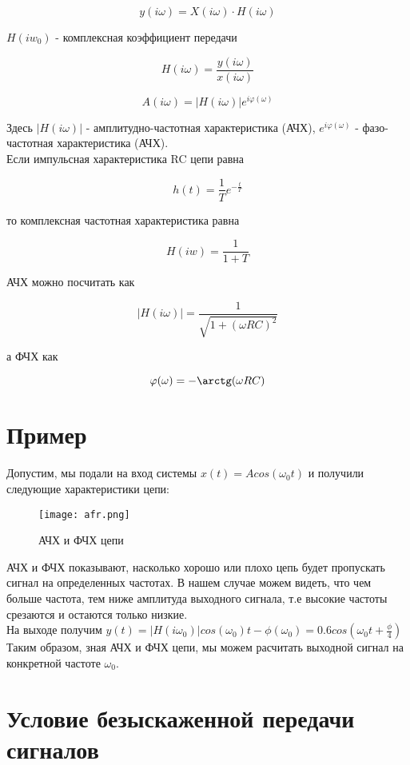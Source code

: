 \[
y(i\omega) = \boxed{X(i\omega) \cdot H(i\omega)}
\]

$H(iw_0)$ - комплексная коэффициент передачи 

\[
H(i\omega) = \frac{y(i\omega)}{x(i\omega)}
\]

\[
A(i\omega) = |H(i\omega)| e^{i\varphi(\omega)}
\]

Здесь $|H(i\omega)|$ - амплитудно-частотная характеристика (АЧХ), $e^{i\varphi(\omega)}$ - фазо-частотная характеристика (АЧХ). \\

Если импульсная характеристика RC цепи равна

\[
h(t) = \frac{1}{T}e^{-\frac{t}{T}}
\]

то комплексная частотная характеристика равна

\[
H(iw) = \frac{1}{1+T}
\]

АЧХ можно посчитать как

\[
|H(i\omega)| = \frac{1}{\sqrt{1 + (\omega RC)^2}}
\]

а ФЧХ как

\[
\varphi(\omega) = -\arctg(\omega RC)
\]

\section*{Пример}

Допустим, мы подали на вход системы $x(t) = Acos(\omega_0t)$ и получили следующие характеристики цепи:

\begin{figure}[H]
    \centering
    \texttt{[image: afr.png]}
    \caption{АЧХ и ФЧХ цепи}
\end{figure}

АЧХ и ФЧХ показывают, насколько хорошо или плохо цепь будет пропускать сигнал на определенных частотах. В нашем случае можем видеть,
что чем больше частота, тем ниже амплитуда выходного сигнала, т.е высокие частоты срезаются и остаются только низкие. \\

На выходе получим $y(t) = |H(i\omega_0)|cos(\omega_0)t-\phi(\omega_0) = 0.6cos(\omega_0t + \frac{\phi}{4})$ \\

Таким образом, зная АЧХ и ФЧХ цепи, мы можем расчитать выходной сигнал на конкретной частоте $\omega_0$.

\section*{Условие безыскаженной передачи сигналов}

